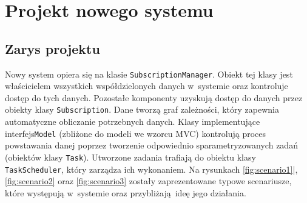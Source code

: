 \chapter{Projekt nowego systemu}

\section{Zarys projektu}
Nowy system opiera się na klasie \lstinline$SubscriptionManager$. Obiekt tej klasy jest właścicielem wszystkich współdzielonych danych w~systemie oraz kontroluje dostęp do tych danych. Pozostałe komponenty uzyskują dostęp do danych przez obiekty klasy \lstinline$Subscription$. Dane tworzą graf zależności, który zapewnia automatyczne obliczanie potrzebnych danych. Klasy implementujące interfejs\lstinline$Model$ (zbliżone do modeli we wzorcu MVC) kontrolują proces powstawania danej poprzez tworzenie odpowiednio sparametryzowanych zadań (obiektów klasy \lstinline$Task$). Utworzone zadania trafiają do obiektu klasy \lstinline$TaskScheduler$, który zarządza ich wykonaniem. Na rysunkach \ref{fig:scenario1}|, \ref{fig:scenario2} oraz \ref{fig:scenario3} zostały zaprezentowane typowe scenariusze, które występują w~systemie oraz przybliżają ideę jego działania.

